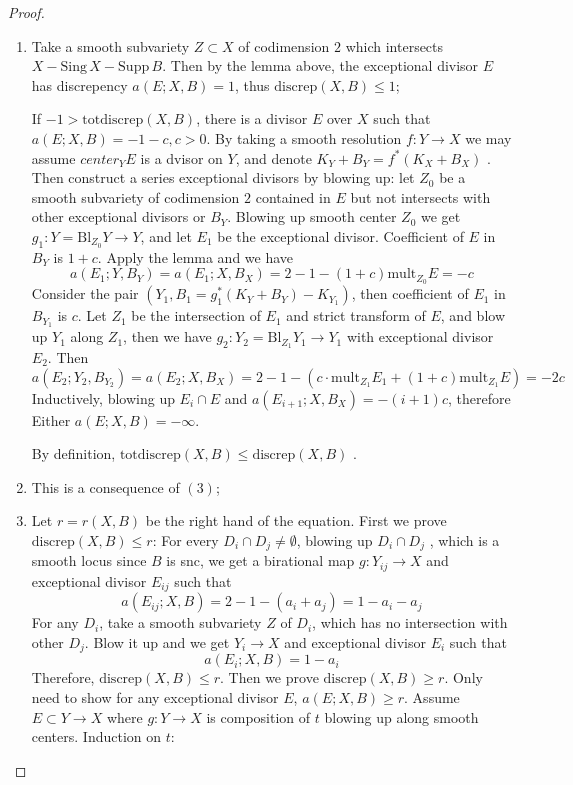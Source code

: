 \documentclass{article}
\begin{document}
\begin{proof}
	\begin{enumerate}[(1)]
		\item Take a smooth subvariety $ Z\subset X $ of codimension $ 2 $ which intersects $ X-\mathrm{Sing}\,X-\mathrm{Supp}\,B $. Then by the lemma above, the exceptional divisor $ E $ has discrepency $ a(E;X,B)=1 $, thus $ \mathrm{discrep }(X,B)\leqslant 1  $;
		
		If $ -1>\mathrm{totdiscrep}(X,B) $, there is a divisor $ E$ over $ X $ such that $ a(E;X,B)=-1-c,c>0 $. By taking a smooth resolution $ f:Y\to X $ we may assume $ center_YE $ is a dvisor on $ Y $, and denote $ K_Y+B_Y=f^*(K_X+B_X)$ . Then construct a series exceptional divisors by blowing up: let $ Z_0 $ be a smooth subvariety of codimension $ 2 $ contained in $ E $ but not intersects with other exceptional divisors or $ B_Y $. Blowing up smooth center $ Z_0 $  we get $ g_1:Y=\mathrm{Bl}_{Z_0}Y\to Y $, and let $ E_1 $ be the exceptional divisor. Coefficient of $ E $ in $ B_Y $ is $ 1+c $. Apply the lemma and we have 
		$$ a(E_1;Y,B_Y)=a(E_1;X,B_X)=2-1-(1+c)\mathrm{mult}_{Z_0}E=-c $$
		Consider the pair $ (Y_1,B_1=g_1^*(K_Y+B_Y)-K_{Y_1}) $, then coefficient of $ E_1 $ in $ B_{Y_1} $ is $ c $. Let $ Z_1 $ be the intersection of $ E_1 $ and strict transform of $ E $,  and blow up $ Y_1 $ along $ Z_1 $, then we have $ g_2:Y_2=\mathrm{Bl}_{Z_1}Y_1\to Y_1 $ with exceptional divisor $ E_2 $. Then
		$$ a(E_2;Y_2,B_{Y_2})=a(E_2;X,B_X)=2-1-(c\cdot\mathrm{mult}_{Z_1}E_1+(1+c)\mathrm{mult}_{Z_1}E)=-2c $$  
		Inductively, blowing up $ E_i\cap E $ and $ a(E_{i+1};X,B_X)=-(i+1)c $, therefore Either $ a(E;X,B)=-\infty $.
		
		By definition, $ \mathrm{totdiscrep}(X,B)\leqslant \mathrm{discrep }(X,B) $ .
		\item This is a consequence of $ (3) $;
		\item Let $ r=r(X,B) $ be the right hand of the equation. First we prove $ \mathrm{discrep}(X,B)\leqslant r $: For every $ D_i\cap D_j\neq \emptyset $, blowing up $ D_i\cap D_j $ , which is a smooth locus since $ B $ is snc, we get a birational map $ g:Y_{ij}\to X $ and exceptional divisor $ E_{ij} $ such that 
		$$ a(E_{ij};X,B)=2-1-(a_i+a_j)=1-a_i-a_j $$
		For any $ D_i $, take a smooth subvariety $ Z $ of $ D_i $, which has no intersection with other $ D_j $. Blow it up and we get $ Y_i\to X $ and exceptional divisor $ E_i $ such that
		$$ a(E_i;X,B)=1-a_i $$
		Therefore,  $ \mathrm{discrep}(X,B)\leqslant r $.
		Then we prove $ \mathrm{discrep}(X,B)\geqslant r $. Only need to show for any exceptional divisor $ E $, $ a(E;X,B)\geqslant r $. Assume $ E\subset Y\to X $ where $ g:Y\to X $ is composition of $ t $ blowing up along smooth centers. Induction on $ t $: 
		

\end{enumerate}
\end{proof}
\end{document}
